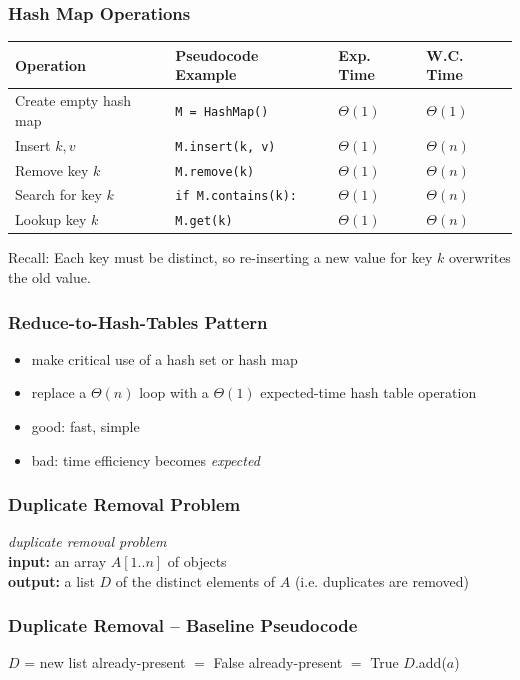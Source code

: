 \documentclass[10pt,aspectratio=169]{beamer}
\begin{document}
\begin{frame} \frametitle{Hash Map Operations}
  \begin{center}
    \begin{tabular}{llll}
      \textbf{Operation} & \textbf{Pseudocode Example} & \textbf{Exp. Time} & \textbf{W.C. Time} \\ \hline
      Create empty hash map & \texttt{M = HashMap()} & $\Theta(1)$ & $\Theta(1)$ \\
      Insert $k, v$ & \texttt{M.insert(k, v)} & $\Theta(1)$ & $\Theta(n)$ \\
      Remove key $k$ & \texttt{M.remove(k)} & $\Theta(1)$ & $\Theta(n)$ \\
      Search for key $k$ & \texttt{if M.contains(k):} & $\Theta(1)$ & $\Theta(n)$ \\
      Lookup key $k$ & \texttt{M.get(k)} & $\Theta(1)$ & $\Theta(n)$ \\
    \end{tabular}
  \end{center}

  \vspace{12pt}
  Recall: Each key must be distinct, so re-inserting a new value for key $k$ overwrites the old value.
\end{frame}

\begin{frame} \frametitle{Reduce-to-Hash-Tables Pattern}
\begin{itemize}
  \item make critical use of a hash set or hash map
  \item replace a $\Theta(n)$ loop with a $\Theta(1)$ expected-time hash table operation
  \item good: fast, simple
  \item bad: time efficiency becomes \emph{expected}
\end{itemize}
\end{frame}

\begin{frame} \frametitle{Duplicate Removal Problem}
  \emph{duplicate removal problem} \\
  \textbf{input:} an array $A[1..n]$ of objects\\
  \textbf{output:} a list $D$ of the distinct elements of $A$ (i.e. duplicates
    are removed)\\

\end{frame}

\begin{frame} \frametitle{Duplicate Removal -- Baseline Pseudocode}
  {\footnotesize
  \begin{algorithmic}[1]
    \State $D$ = new list
        \State already-present $ = $ False
            \State already-present $ = $ True
          \EndIf
        \EndFor
          \State $D$.add($a$)
        \EndIf
    \EndFor
    \State {}
    \EndFunction
  \end{algorithmic}
  }
\end{frame}
\end{document}
